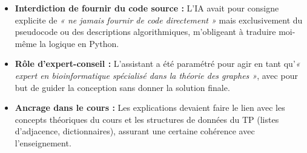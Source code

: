 \documentclass[12pt,a4paper]{article}
\begin{document}
\begin{itemize}
    \item \textbf{Interdiction de fournir du code source :} L'IA avait pour consigne explicite de \textit{« ne jamais fournir de code directement »} mais exclusivement du pseudocode ou des descriptions algorithmiques, m'obligeant à traduire moi-même la logique en Python.
    \item \textbf{Rôle d'expert-conseil :} L'assistant a été paramétré pour agir en tant qu'\textit{« expert en bioinformatique spécialisé dans la théorie des graphes »}, avec pour but de guider la conception sans donner la solution finale.
    \item \textbf{Ancrage dans le cours :} Les explications devaient faire le lien avec les concepts théoriques du cours et les structures de données du TP (listes d'adjacence, dictionnaires), assurant une certaine cohérence avec l'enseignement.
\end{itemize}

\nolinenumbers
\printbibliography
\end{document}
